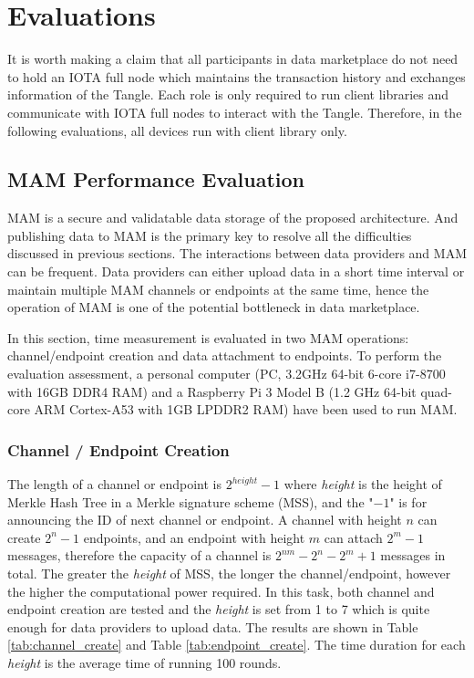\documentclass[conference]{IEEEtran}
\begin{document}
\section{Evaluations}
It is worth making a claim that all participants in data marketplace do not need to hold an IOTA full node which maintains the transaction history and exchanges information of the Tangle. Each role is only required to run client libraries and communicate with IOTA full nodes to interact with the Tangle. Therefore, in the following evaluations, all devices run with client library only.

\subsection{MAM Performance Evaluation}
\label{section:mam_performance}
MAM is a secure and validatable data storage of the proposed architecture. And publishing data to MAM is the primary key to resolve all the difficulties discussed in previous sections. The interactions between data providers and MAM can be frequent. Data providers can either upload data in a short time interval or maintain multiple MAM channels or endpoints at the same time, hence the operation of MAM is one of the potential bottleneck in data marketplace.

In this section, time measurement is evaluated in two MAM operations: channel/endpoint creation and data attachment to endpoints. To perform the evaluation assessment, a personal computer (PC, 3.2GHz 64-bit 6-core i7-8700 with 16GB DDR4 RAM) and a Raspberry Pi 3 Model B (1.2 GHz 64-bit quad-core ARM Cortex-A53 with 1GB LPDDR2 RAM) have been used to run MAM. 

\subsubsection{Channel / Endpoint Creation}
The length of a channel or endpoint is $2^{height}-1$ where \textit{height} is the height of Merkle Hash Tree in a Merkle signature scheme (MSS), and the "$-1$" is for announcing the ID of next channel or endpoint. A channel with height $n$ can create $2^n-1$ endpoints, and an endpoint with height $m$ can attach $2^m-1$ messages, therefore the capacity of a channel is $2^{nm}-2^n-2^m+1$ messages in total. The greater the \textit{height} of MSS, the longer the channel/endpoint, however the higher the computational power required. In this task, both channel and endpoint creation are tested and the \textit{height} is set from 1 to 7 which is quite enough for data providers to upload data. The results are shown in Table \ref{tab:channel_create} and Table \ref{tab:endpoint_create}. The time duration for each \textit{height} is the average time of running 100 rounds.
\end{document}
